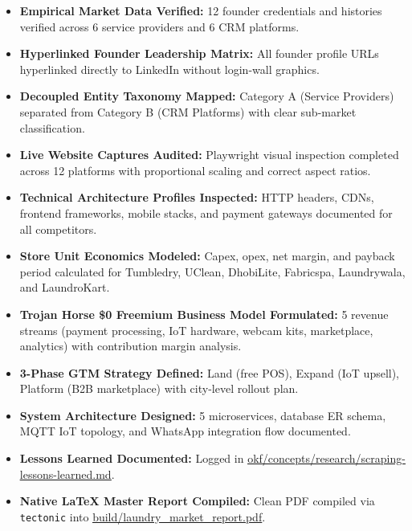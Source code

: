 \documentclass[11pt,a4paper]{article}
\begin{document}
\vspace{0.5cm}

\begin{tcolorbox}[colback=greenbg,colframe=greenaccent,title=\textbf{Strategic Execution Checklist for Launch:}]
    \begin{itemize}[leftmargin=*]
        \item [\textbf{[X]}] \textbf{Empirical Market Data Verified:} 12 founder credentials and histories verified across 6 service providers and 6 CRM platforms.
        \item [\textbf{[X]}] \textbf{Hyperlinked Founder Leadership Matrix:} All founder profile URLs hyperlinked directly to LinkedIn without login-wall graphics.
        \item [\textbf{[X]}] \textbf{Decoupled Entity Taxonomy Mapped:} Category A (Service Providers) separated from Category B (CRM Platforms) with clear sub-market classification.
        \item [\textbf{[X]}] \textbf{Live Website Captures Audited:} Playwright visual inspection completed across 12 platforms with proportional scaling and correct aspect ratios.
        \item [\textbf{[X]}] \textbf{Technical Architecture Profiles Inspected:} HTTP headers, CDNs, frontend frameworks, mobile stacks, and payment gateways documented for all competitors.
        \item [\textbf{[X]}] \textbf{Store Unit Economics Modeled:} Capex, opex, net margin, and payback period calculated for Tumbledry, UClean, DhobiLite, Fabricspa, Laundrywala, and LaundroKart.
        \item [\textbf{[X]}] \textbf{Trojan Horse \$0 Freemium Business Model Formulated:} 5 revenue streams (payment processing, IoT hardware, webcam kits, marketplace, analytics) with contribution margin analysis.
        \item [\textbf{[X]}] \textbf{3-Phase GTM Strategy Defined:} Land (free POS), Expand (IoT upsell), Platform (B2B marketplace) with city-level rollout plan.
        \item [\textbf{[X]}] \textbf{System Architecture Designed:} 5 microservices, database ER schema, MQTT IoT topology, and WhatsApp integration flow documented.
        \item [\textbf{[X]}] \textbf{Lessons Learned Documented:} Logged in \href{file:///c:/projects/laundry/research/okf/concepts/research/scraping-lessons-learned.md}{\underline{okf/concepts/research/scraping-lessons-learned.md}}.
        \item [\textbf{[X]}] \textbf{Native LaTeX Master Report Compiled:} Clean PDF compiled via \texttt{tectonic} into \href{file:///c:/projects/laundry/research/build/laundry_market_report.pdf}{\underline{build/laundry\_market\_report.pdf}}.
    \end{itemize}
\end{tcolorbox}
\end{document}
